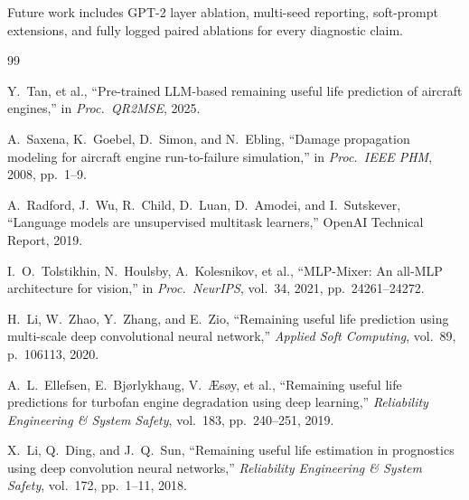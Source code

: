 \documentclass[10pt,twocolumn]{article}
\begin{document}
Future work includes GPT-2 layer ablation, multi-seed reporting, soft-prompt extensions, and fully logged paired ablations for every diagnostic claim.

\begin{thebibliography}{99}

Y.~Tan, et al.,
``Pre-trained LLM-based remaining useful life prediction of aircraft engines,''
in \emph{Proc.\ QR2MSE}, 2025.

A.~Saxena, K.~Goebel, D.~Simon, and N.~Ebling,
``Damage propagation modeling for aircraft engine run-to-failure simulation,''
in \emph{Proc.\ IEEE PHM}, 2008, pp.~1--9.

A.~Radford, J.~Wu, R.~Child, D.~Luan, D.~Amodei, and I.~Sutskever,
``Language models are unsupervised multitask learners,''
OpenAI Technical Report, 2019.

I.~O.~Tolstikhin, N.~Houlsby, A.~Kolesnikov, et al.,
``MLP-Mixer: An all-MLP architecture for vision,''
in \emph{Proc.\ NeurIPS}, vol.~34, 2021, pp.~24261--24272.

H.~Li, W.~Zhao, Y.~Zhang, and E.~Zio,
``Remaining useful life prediction using multi-scale deep convolutional neural network,''
\emph{Applied Soft Computing}, vol.~89, p.~106113, 2020.

A.~L.~Ellefsen, E.~Bj{\o}rlykhaug, V.~{\AE}s{\o}y, et al.,
``Remaining useful life predictions for turbofan engine degradation using deep learning,''
\emph{Reliability Engineering \& System Safety}, vol.~183, pp.~240--251, 2019.

X.~Li, Q.~Ding, and J.~Q.~Sun,
``Remaining useful life estimation in prognostics using deep convolution neural networks,''
\emph{Reliability Engineering \& System Safety}, vol.~172, pp.~1--11, 2018.

\end{thebibliography}
\end{document}

